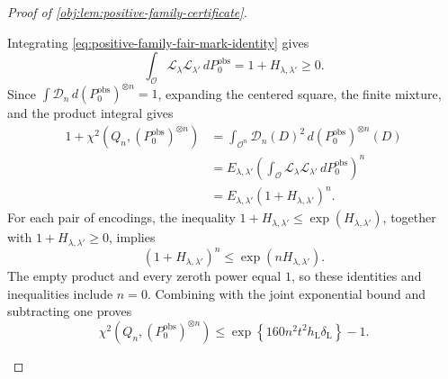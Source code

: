 \documentclass[11pt]{article}
\begin{document}
\begin{proof}[Proof of \cref{obj:lem:positive-family-certificate}]
\begin{enumerate}
Integrating \cref{eq:positive-family-fair-mark-identity} gives
\[
\int_{\mathcal O}\mathscr L_\lambda\mathscr L_{\lambda'}
                      \,dP_0^{\mathrm{obs}}
=1+H_{\lambda,\lambda'}\ge0.
\]
Since \(\int\mathscr D_n\,d(P_0^{\mathrm{obs}})^{\otimes n}=1\),
expanding the centered square, the finite mixture, and the product
integral gives
\[
\begin{aligned}
1+\chi^2\!\left(Q_n,(P_0^{\mathrm{obs}})^{\otimes n}\right)
&=\int_{\mathcal O^n}\mathscr D_n(D)^2\,
                         d(P_0^{\mathrm{obs}})^{\otimes n}(D)\\
&=E_{\lambda,\lambda'}
 \left(\int_{\mathcal O}
       \mathscr L_\lambda\mathscr L_{\lambda'}\,dP_0^{\mathrm{obs}}
 \right)^n\\
&=E_{\lambda,\lambda'}(1+H_{\lambda,\lambda'})^n.
\end{aligned}
\]
For each pair of encodings, the inequality \(1+H_{\lambda,\lambda'}
\le\exp(H_{\lambda,\lambda'})\), together with
\(1+H_{\lambda,\lambda'}\ge0\), implies
\[
(1+H_{\lambda,\lambda'})^n
\le\exp(nH_{\lambda,\lambda'}).
\]
The empty product and every zeroth power equal \(1\), so these
identities and inequalities include \(n=0\). Combining with the joint
exponential bound and subtracting one proves
\[
\chi^2\!\left(Q_n,(P_0^{\mathrm{obs}})^{\otimes n}\right)
\le
\exp\!\left\{160n^2t^2h_{\mathrm L}\delta_{\mathrm L}\right\}-1.
\]


\end{enumerate}
\end{proof}
\end{document}
